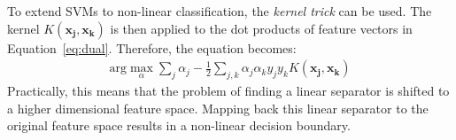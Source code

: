To extend SVMs to non-linear classification, the \emph{kernel trick}
can be used. The kernel $K(\mathbf{x_j}, \mathbf{x_k})$ is then applied to the dot products of feature vectors in Equation~\ref{eq:dual}. Therefore, the equation becomes:
\begin{align}
\label{eq:dualkernel}
\text{arg}\max_\alpha\sum_j\alpha_j - \frac{1}{2}\sum_{j,k}\alpha_j\alpha_ky_jy_kK(\mathbf{x_j}, \mathbf{x_k})
\end{align} 
Practically, this means that the problem of finding a linear separator is shifted to a higher dimensional feature space. Mapping back this linear separator to the original feature space results in a non-linear decision boundary. 